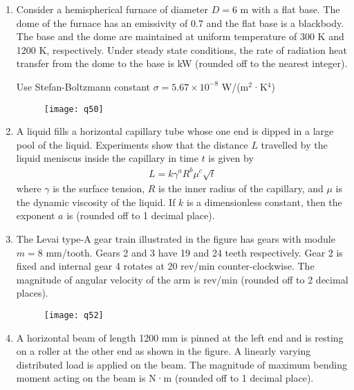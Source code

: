\documentclass[journal,11pt,onecolumn]{IEEEtran}
\begin{document}
\begin{enumerate}[resume]
    \item Consider a hemispherical furnace of diameter $D = 6$ m with a flat base. The dome of the furnace has an emissivity of 0.7 and the flat base is a blackbody. The base and the dome are maintained at uniform temperature of 300 K and 1200 K, respectively. Under steady state conditions, the rate of radiation heat transfer from the dome to the base is \underline{\hspace{2cm}} kW (rounded off to the nearest integer).

          Use Stefan-Boltzmann constant $\sigma = 5.67 \times 10^{-8}$ W/(m$^2$·K$^4$)
          \begin{figure}[H]
              \centering
              \texttt{[image: q50]}
              \caption{}
              \label{fig:q50}
          \end{figure}

    \item A liquid fills a horizontal capillary tube whose one end is dipped in a large pool of the liquid. Experiments show that the distance $L$ travelled by the liquid meniscus inside the capillary in time $t$ is given by
          \begin{align}
              L = k \gamma^a R^b \mu^c \sqrt{t}
          \end{align}
          where $\gamma$ is the surface tension, $R$ is the inner radius of the capillary, and $\mu$ is the dynamic viscosity of the liquid. If $k$ is a dimensionless constant, then the exponent $a$ is \underline{\hspace{2cm}} (rounded off to 1 decimal place).

    \item The Levai type-A gear train illustrated in the figure has gears with module $m = 8$ mm/tooth. Gears 2 and 3 have 19 and 24 teeth respectively. Gear 2 is fixed and internal gear 4 rotates at 20 rev/min counter-clockwise. The magnitude of angular velocity of the arm is \underline{\hspace{2cm}} rev/min (rounded off to 2 decimal places).

          \begin{figure}[H]
              \centering
              \texttt{[image: q52]}
              \caption{}
              \label{fig:q52}
          \end{figure}

    \item A horizontal beam of length 1200 mm is pinned at the left end and is resting on a roller at the other end as shown in the figure. A linearly varying distributed load is applied on the beam. The magnitude of maximum bending moment acting on the beam is \underline{\hspace{2cm}} N·m (rounded off to 1 decimal place).


\end{enumerate}
\end{document}
